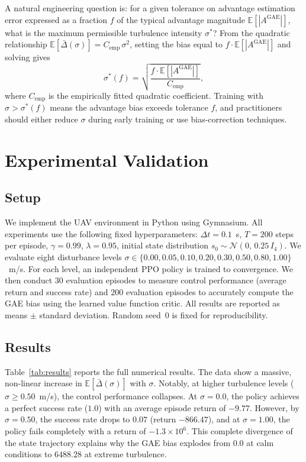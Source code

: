 \documentclass[10pt, conference]{IEEEtran}
\begin{document}
A natural engineering question is: for a given tolerance on advantage
estimation error expressed as a fraction $f$ of the typical advantage
magnitude $\mathbb{E}[|A^{\text{GAE}}|]$, what is the maximum permissible
turbulence intensity $\sigma^*$? From the quadratic relationship
$\mathbb{E}[\bar{\Delta}(\sigma)] = C_{\text{emp}}\,\sigma^2$, setting
the bias equal to $f\cdot\mathbb{E}[|A^{\text{GAE}}|]$ and solving gives
\begin{equation}
  \label{eq:sigstar}
  \sigma^*(f) = \sqrt{\frac{f\cdot\mathbb{E}[|A^{\text{GAE}}|]}
  {C_{\text{emp}}}},
\end{equation}
where $C_{\text{emp}}$ is the empirically fitted quadratic coefficient.
Training with $\sigma > \sigma^*(f)$ means the advantage bias exceeds
tolerance $f$, and practitioners should either reduce $\sigma$ during
early training or use bias-correction techniques.

\section{Experimental Validation}

\subsection{Setup}

We implement the UAV environment in Python using Gymnasium. All experiments
use the following fixed hyperparameters: $\Delta t = 0.1$~s, $T = 200$
steps per episode, $\gamma = 0.99$, $\lambda = 0.95$, initial state
distribution $s_0 \sim \mathcal{N}(0,\,0.25\,I_4)$. We evaluate eight
disturbance levels $\sigma \in \{0.00, 0.05, 0.10, 0.20, 0.30, 0.50, 0.80, 1.00\}$~m/s.
For each level, an independent PPO policy is trained to convergence.
We then conduct $30$ evaluation episodes to measure control performance
(average return and success rate) and $200$ evaluation episodes to accurately
compute the GAE bias using the learned value function critic. All results
are reported as means $\pm$ standard deviation. Random seed~0 is
fixed for reproducibility.

\subsection{Results}

Table~\ref{tab:results} reports the full numerical results. The data
show a massive, non-linear increase in $\mathbb{E}[\bar{\Delta}(\sigma)]$
with $\sigma$. Notably, at higher turbulence levels ($\sigma \ge 0.50$~m/s),
the control performance collapses. At $\sigma=0.0$, the policy achieves a
perfect success rate ($1.0$) with an average episode return of $-9.77$.
However, by $\sigma=0.50$, the success rate drops to $0.07$ (return $-866.47$),
and at $\sigma=1.00$, the policy fails completely with a return of $-1.3 \times 10^6$.
This complete divergence of the state trajectory explains why the GAE bias explodes
from $0.0$ at calm conditions to $6488.28$ at extreme turbulence.
\end{document}
